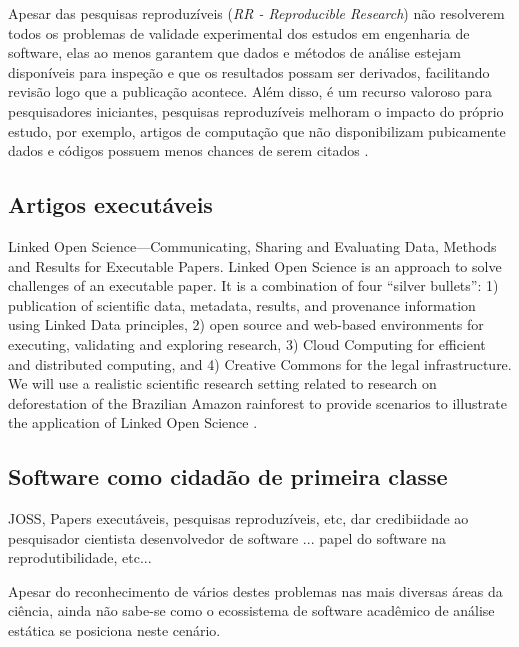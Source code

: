 Apesar das pesquisas reproduzíveis ({\it RR - Reproducible Research}) não
resolverem todos os problemas de validade experimental dos estudos em
engenharia de software, elas ao menos garantem que dados e métodos de análise
estejam disponíveis para inspeção e que os resultados possam ser derivados,
facilitando revisão logo que a publicação acontece. Além disso, é um recurso
valoroso para pesquisadores iniciantes, pesquisas reproduzíveis melhoram o
impacto do próprio estudo, por exemplo, artigos de computação que não
disponibilizam pubicamente dados e códigos possuem menos chances de serem
citados \cite{madeyski2017would}.

\subsection{Artigos executáveis}

Linked Open Science—Communicating, Sharing and Evaluating
Data, Methods and Results for Executable Papers.
Linked Open Science is an approach to solve challenges of an executable paper. It is a combination of four “silver
bullets”: 1) publication of scientific data, metadata, results, and provenance information using Linked Data principles,
2) open source and web-based environments for executing, validating and exploring research, 3) Cloud Computing
for efficient and distributed computing, and 4) Creative Commons for the legal infrastructure. We will use a realistic
scientific research setting related to research on deforestation of the Brazilian Amazon rainforest to provide scenarios
to illustrate the application of Linked Open Science \cite{Kauppinen2011}.

\subsection{Software como cidadão de primeira classe}

JOSS, Papers executáveis, pesquisas reproduzíveis, etc, dar credibiidade ao
pesquisador cientista desenvolvedor de software ... papel do software na
reprodutibilidade, etc...

Apesar do reconhecimento de vários destes problemas nas mais diversas
áreas da ciência, ainda não sabe-se como o ecossistema de software
acadêmico de análise estática se posiciona neste cenário.


